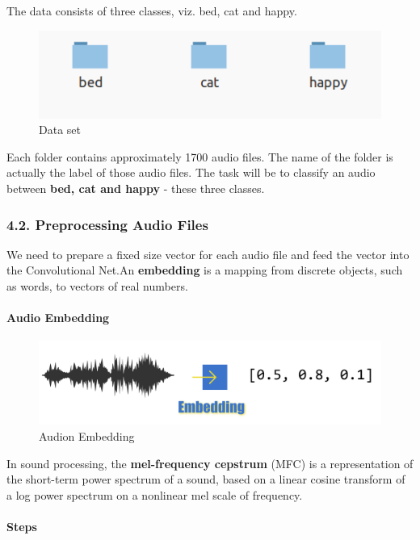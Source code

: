 \documentclass[11pt]{article}
\makeatletter
\def\maxwidth{\ifdim\Gin@nat@width>\linewidth\linewidth
    \else\Gin@nat@width\fi}
\let\Oldincludegraphics\includegraphics
\renewcommand{\includegraphics}[1]{\Oldincludegraphics[width=.8\maxwidth]{#1}}
\makeatother
\begin{document}
    The data consists of three classes, viz. bed, cat and happy.

    \begin{figure}
\centering
\includegraphics{download.png}
\caption{Data set}
\end{figure}

    Each folder contains approximately 1700 audio files. The name of the
folder is actually the label of those audio files. The task will be to
classify an audio between \textbf{bed, cat and happy} - these three
classes.

    \subsubsection{4.2. Preprocessing Audio
Files}\label{preprocessing-audio-files}

    We need to prepare a fixed size vector for each audio file and feed the
vector into the Convolutional Net.An \textbf{embedding} is a mapping
from discrete objects, such as words, to vectors of real numbers.

    \paragraph{Audio Embedding}\label{audio-embedding}

    \begin{figure}
\centering
\includegraphics{Aembed.png}
\caption{Audion Embedding}
\end{figure}

In sound processing, the \textbf{mel-frequency cepstrum} (MFC) is a
representation of the short-term power spectrum of a sound, based on a
linear cosine transform of a log power spectrum on a nonlinear mel scale
of frequency.

    \paragraph{Steps}\label{steps}
\end{document}
